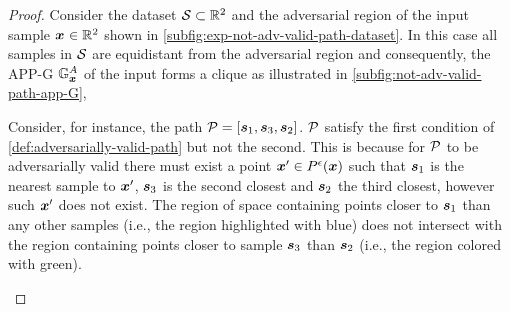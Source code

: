 \begin{proof}
Consider the dataset $\set \subset \R[2]$ and the adversarial region of the input sample $\x[] \in \R[2]$ shown in \autoref{subfig:exp-not-adv-valid-path-dataset}. In this case all samples in $\set$ are equidistant from the adversarial region and consequently, the \acs{APP-G} $\APPG$ of the input forms a clique as illustrated in \autoref{subfig:not-adv-valid-path-app-G},

Consider, for instance, the path $\vpath = [\sample[1], \sample[3], \sample[2]]$. $\vpath$ satisfy the first condition of \autoref{def:adversarially-valid-path} but not the second. This is because for $\vpath$ to be adversarially valid there must exist a point $\x[]' \in \pert$ such that $\sample[1]$ is the nearest sample to $\x[]'$, $\sample[3]$ is the second closest and $ \sample[2]$ the third closest, however such $\x[]'$ does not exist. The region of space containing points closer to $\sample[1]$ than any other samples (i.e., the region highlighted with blue) does not intersect with the region containing points closer to sample $\sample[3]$ than $\sample[2]$ (i.e., the region colored with green).

\begin{figure}[h]
  \centering
  \begin{subfigure}{0.5\linewidth}
\end{subfigure}
\end{figure}
\end{proof}
